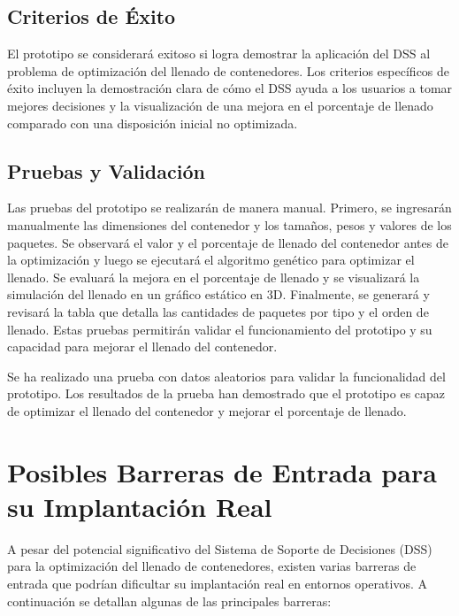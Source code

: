\documentclass[9pt,a4paper]{rho}
\begin{document}
\subsection{Criterios de Éxito}
El prototipo se considerará exitoso si logra demostrar la aplicación del DSS al problema de optimización del llenado de contenedores. Los criterios específicos de éxito \cite{newman2000success} incluyen la demostración clara de cómo el DSS ayuda a los usuarios a tomar mejores decisiones y la visualización de una mejora en el porcentaje de llenado comparado con una disposición inicial no optimizada.

\subsection{Pruebas y Validación}

Las pruebas del prototipo se realizarán de manera manual. Primero, se ingresarán manualmente las dimensiones del contenedor y los tamaños, pesos y valores de los paquetes. Se observará el valor y el porcentaje de llenado del contenedor antes de la optimización y luego se ejecutará el algoritmo genético para optimizar el llenado. Se evaluará la mejora en el porcentaje de llenado y se visualizará la simulación del llenado en un gráfico estático en 3D. Finalmente, se generará y revisará la tabla que detalla las cantidades de paquetes por tipo y el orden de llenado. Estas pruebas permitirán validar el funcionamiento del prototipo y su capacidad para mejorar el llenado del contenedor.

\begin{rhoenv}[frametitle=Prueba con datos aleatorios]
    Se ha realizado una prueba con datos aleatorios para validar la funcionalidad del prototipo. Los resultados de la prueba han demostrado que el prototipo es capaz de optimizar el llenado del contenedor y mejorar el porcentaje de llenado.
\end{rhoenv}


\section{Posibles Barreras de Entrada para su Implantación Real}

A pesar del potencial significativo del Sistema de Soporte de Decisiones (DSS) para la optimización del llenado de contenedores, existen varias barreras de entrada que podrían dificultar su implantación real en entornos operativos. A continuación se detallan algunas de las principales barreras:
\end{document}
